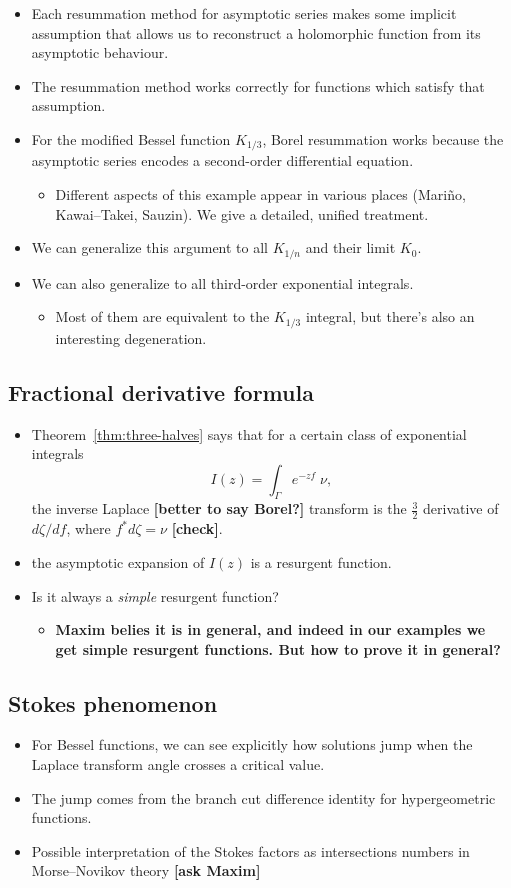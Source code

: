 \documentclass{article}
\begin{document}
\begin{itemize}
\item Each resummation method for asymptotic series makes some implicit assumption that allows us to reconstruct a holomorphic function from its asymptotic behaviour.
\item The resummation method works correctly for functions which satisfy that assumption.
\item For the modified Bessel function $K_{1/3}$, Borel resummation works because the asymptotic series encodes a second-order differential equation.
\begin{itemize}
\item Different aspects of this example appear in various places (Mari\~{n}o, Kawai--Takei, Sauzin). We give a detailed, unified treatment.
\end{itemize}
\item We can generalize this argument to all $K_{1/n}$ and their limit $K_0$.
\item We can also generalize to all third-order exponential integrals.
\begin{itemize}
\item Most of them are equivalent to the $K_{1/3}$ integral, but there's also an interesting degeneration.
\end{itemize}
\end{itemize}
\subsection{Fractional derivative formula}
\begin{itemize}
\item Theorem~\ref{thm:three-halves} says that for a certain class of exponential integrals
\[ I(z) = \int_\Gamma e^{-zf}\;\nu, \]
the inverse Laplace \textbf{[better to say Borel?]} transform is the $\tfrac{3}{2}$ derivative of $d\zeta/df$, where $f^* d\zeta = \nu$ \textbf{[check]}.
\item the asymptotic expansion of $I(z)$ is a resurgent function.
\item Is it always a \emph{simple} resurgent function?
\begin{itemize}
\item \textbf{Maxim belies it is in general, and indeed in our examples we get simple resurgent functions. But how to prove it in general?}
\end{itemize} 
\end{itemize}
\subsection{Stokes phenomenon}
\begin{itemize}
\item For Bessel functions, we can see explicitly how solutions jump when the Laplace transform angle crosses a critical value.
\item The jump comes from the branch cut difference identity for hypergeometric functions.
\item Possible interpretation of the Stokes factors as intersections numbers in Morse--Novikov theory \textbf{[ask Maxim]}
\end{itemize}
\end{document}
